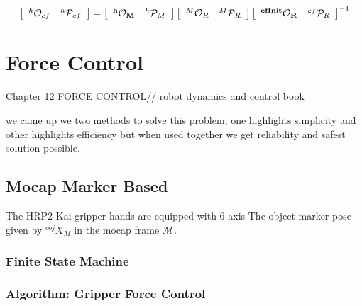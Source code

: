 \begin{gather}\label{X_efinit_hori}
\left[\begin{array}{cc}
{}^{h}\mathcal{O}_{ef} & {}^{h}\mathcal{P}_{ef}
\end{array}\right] =
\left[\begin{array}{cc}
\bf{{}^{h}\mathcal{O}_M} & {}^{h}\mathcal{P}_M
\end{array}\right]
\left[\begin{array}{cc}
{}^{M}\mathcal{O}_R & {}^{M}\mathcal{P}_R
\end{array}\right]
\left[\begin{array}{cc}
\bf{{}^{efInit}\mathcal{O}_{R}} & {}^{ef}\mathcal{P}_{R}
\end{array}\right]^{-1}
\end{gather}


\newpage
\section{Force Control}
Chapter 12
FORCE CONTROL// robot dynamics and control book


we came up we two methods to solve this problem, one highlights simplicity and other highlights efficiency but when used together we get reliability and safest solution possible.


\subsection{Mocap Marker Based}
The HRP2-Kai gripper hands are equipped with 6-axis The object marker pose given by $\mathcal{}^{obj}{X}_M$ in the mocap frame $\mathcal{M}$.





\subsubsection{Finite State Machine}



\subsubsection{Algorithm: Gripper Force Control}

